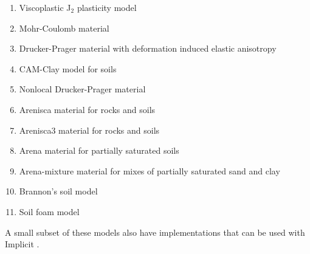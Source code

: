 \begin{enumerate}
  \item Viscoplastic J$_2$ plasticity model
  \item Mohr-Coulomb material
  \item Drucker-Prager material with deformation induced elastic anisotropy
  \item CAM-Clay model for soils
  \item Nonlocal Drucker-Prager material
  \item Arenisca material for rocks and soils
  \item Arenisca3 material for rocks and soils
  \item Arena material for partially saturated soils
  \item Arena-mixture material for mixes of partially saturated sand and clay
  \item Brannon's soil model
  \item Soil foam model
\end{enumerate}
A small subset of these models also have implementations that can be used with
Implicit \MPM.

